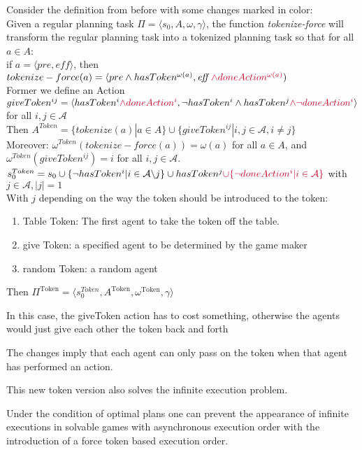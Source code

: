 Consider the definition from before with some changes marked in color: \\
Given a regular planning task $\Pi = \langle s_0, A, \omega, \gamma \rangle $, the function \textit{tokenize-force} will transform the regular planning task into a tokenized planning task so that for all $a \in A$: \\
 if $a = \langle pre, \textit{eff} \rangle$, then
   $tokenize-force(a) =\langle pre \wedge hasToken^{\omega(a)}, \textit{eff } {\color{UniRed} \wedge doneAction^{\omega(a)}})$ \\
Former we define an Action
    $ giveToken^{ij} = \langle hasToken^i {\color{UniRed}\wedge doneAction^i}, \neg hasToken^i \wedge hasToken^j {\color{UniRed} \wedge \neg doneAction^i} \rangle $
    for all $i,j \in \mathcal{A}$
    \\
Then $ A^{Token}=\{tokenize(a)|a \in A\} \cup \{giveToken^{ij}|i,j \in \mathcal{A}, i \not = j\}
$ \\
Moreover: $\omega^{Token}(tokenize-force(a))= \omega(a)$ for all $a \in A$,
and $\omega^{Token}(giveToken^{ij}) = i$ for all $i,j \in \mathcal{A}$. \\
$s_0^{Token} = s_0 \cup \{\neg hasToken^i|i \in \mathcal{A} \backslash j\} \cup hasToken^j {\color{UniRed} \cup  \{ \neg doneAction^i| i \in \mathcal{A} \}}$ with $j \in \mathcal{A}, |j|=1$\\
With $j$ depending on the way the token should be introduced to the token:
\begin{enumerate}
  \item Table Token:
    The first agent to take the token off the table.
  \item give Token:
    a specified agent to be determined by the game maker
  \item random Token:
    a random agent
\end{enumerate}
Then $ \Pi^{\text{Token}} = \langle s_0^{Token}, A ^{\text{Token}}, \omega ^{\text{Token}}, \gamma \rangle $

In this case, the giveToken action has to cost something, otherwise the agents would just give each other the token back and forth

The changes imply that each agent can only pass on the token when that agent has performed an action.

This new token version also solves the infinite execution problem.

\begin{theorem}
  Under the condition of optimal plans one can prevent the appearance of infinite executions in solvable games with asynchronous execution order with the introduction of a force token based execution order.
\end{theorem}

